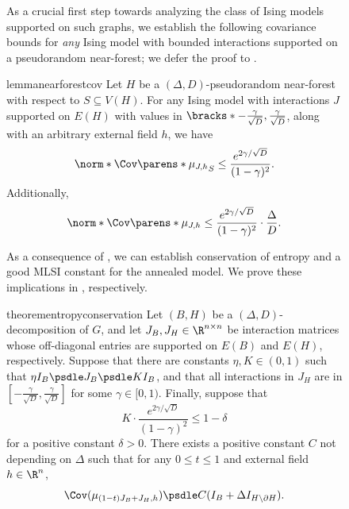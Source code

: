 \documentclass[11pt,letterpaper]{article}
\begin{document}
\begin{figure}
    As a crucial first step towards analyzing the class of Ising models supported on such graphs, we establish the following covariance bounds for \emph{any} Ising model with bounded interactions supported on a pseudorandom near-forest; we defer the proof to . 
    \begin{restatable}{lemma}{nearforestcov}
        \label{lem:near-forest-cov}
        Let $H$ be a $(\Delta,D)$-pseudorandom near-forest with respect to $S \subseteq V(H)$.
        For any Ising model with interactions $J$ supported on $E(H)$ with values in $\bracks*{-\frac{\gamma}{\sqrt{D}}, \frac{\gamma}{\sqrt{D}}}$, along with an arbitrary external field $h$, we have
        \[
            \norm*{\Cov\parens*{\mu_{J,h}}_S} \le \frac{e^{2\gamma/\sqrt{D}}}{(1-\gamma)^2}.
        \]
        Additionally,
        \[
            \norm*{\Cov\parens*{\mu_{J,h}}} \le \frac{e^{2\gamma/\sqrt{D}}}{(1-\gamma)^2} \cdot \frac{\Delta}{D}.
        \]
    \end{restatable}

    As a consequence of , we can establish conservation of entropy and a good MLSI constant for the annealed model. We prove these implications in , respectively.

    \begin{restatable}{theorem}{entropyconservation}
        \label{thm:entropy-conservation}
        Let $(B, H)$ be a $(\Delta, D)$-decomposition of $G$, and let $J_B, J_H \in \R^{n \times n}$ be interaction matrices whose off-diagonal entries are supported on $E(B)$ and $E(H)$, respectively. Suppose that there are constants $\eta, K \in (0, 1)$ such that $\eta I_B \psdle J_B \psdle K I_B$, and that all interactions in $J_H$ are in $\left[ - \frac{\gamma}{\sqrt{D}} , \frac{\gamma}{\sqrt{D}} \right]$ for some $\gamma \in [0, 1)$. Finally, suppose that 
        \[
            K \cdot \frac{e^{2\gamma/\sqrt{D}}}{(1-\gamma)^2} \le 1 - \delta
        \]
        for a positive constant $\delta > 0$.
        There exists a positive constant $C$ not depending on $\Delta$ such that for any $0 \le t \le 1$ and external field $h \in \R^{n}$,
        \[ \Cov(\mu_{(1-t)J_B + J_H,h}) \psdle C (I_B + \Delta I_{H \setminus \partial H}). \]
    \end{restatable}
    

\end{figure}
\end{document}
